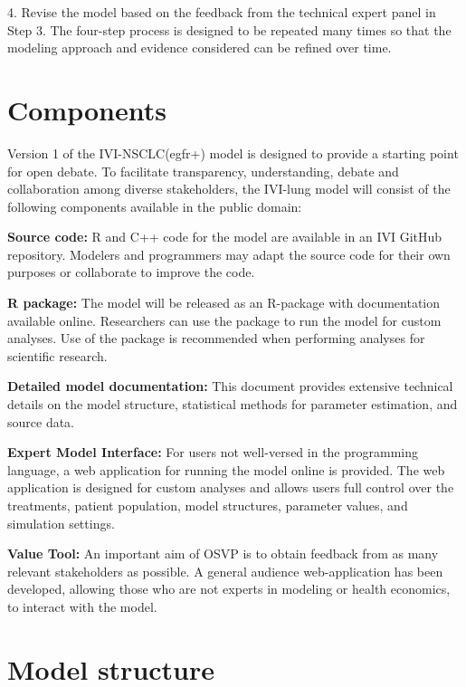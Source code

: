 \documentclass[11pt,final,fleqn]{article}\usepackage[]{graphicx}\usepackage[]{color}
\theoremstyle{plain}
\begin{document}
{4.	Revise the model based on the feedback from the technical expert panel in Step 3.
The four-step process is designed to be repeated many times so that the modeling approach and evidence considered can be refined over time. 


\section{Components}\label{sec:components}
Version 1 of the IVI-NSCLC(egfr+) model is designed to provide a starting point for open debate. To facilitate transparency, understanding, debate and collaboration among diverse stakeholders, the IVI-lung model will consist of the following components available in the public domain:

\textbf{Source code:} R and C++ code for the model are available in an IVI GitHub repository. Modelers and programmers may adapt the source code for their own purposes or collaborate to improve the code.

\textbf{R package:} The model will be released as an R-package with documentation available online. Researchers can use the package to run the model for custom analyses. Use of the package is recommended when performing analyses for scientific research.

\textbf{Detailed model documentation:} This document provides extensive technical details on the model structure, statistical methods for parameter estimation, and source data.

\textbf{Expert Model Interface:} For users not well-versed in the programming language, a web application for running the model online is provided. The web application is designed for custom analyses and allows users full control over the treatments, patient population, model structures, parameter values, and simulation settings.

\textbf{Value Tool:} An important aim of OSVP is to obtain feedback from as many relevant stakeholders as possible. A general audience web-application has been developed, allowing those who are not experts in modeling or health economics, to interact with the model.


\section{Model structure}\label{sec:model-structure}
}
\end{document}
